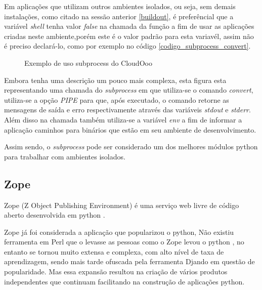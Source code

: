 Em aplicações que utilizam outros ambientes isolados, ou seja, sem demais instalações, como citado na sessão anterior \ref{buildout}, é preferêncial que a variável \textit{shell} tenha valor \textit{false} na chamada da função a fim de usar as aplicações criadas neste ambiente,porém este é o valor padrão para esta variavél, assim não é preciso declará-lo, como por exemplo no código \ref{codigo_subprocess_convert}.

\begin{figure}[ht]
    \centering
    \caption{Exemplo de uso subprocess do CloudOoo}
    \label{subprocess_convert}
\end{figure}

Embora tenha uma descrição um pouco mais complexa, esta figura esta representando uma chamada do \textit{subprocess} em que utiliza-se o comando \textit{convert}, utiliza-se a opção \textit{PIPE} para que, após executado, o comando retorne as mensagens de saída e erro respectivamente através das variáveis \textit{stdout} e \textit{stderr}. Além disso na chamada também utiliza-se a variável \textit{env} a fim de informar a aplicação caminhos para binários que estão em seu ambiente de desenvolvimento.

Assim sendo, o \textit{subprocess} pode ser considerado um dos melhores módulos python para trabalhar com ambientes isolados.

\subsection{Zope}

Zope (Z Object Publishing Environment) é uma serviço web livre de código aberto desenvolvida em python \cite{ZOPE2}.

Zope já foi considerada a aplicação que popularizou o python, Não existiu ferramenta em Perl que o levasse as pessoas como o Zope levou o python \cite{UDELL}, no entanto se tornou muito extensa e complexa, com alto nível de taxa de aprendizagem, sendo mais tarde ofuscada pela ferramenta Djando em questão de popularidade. Mas essa expansão resultou na criação de vários produtos independentes que continuam facilitando na construção de aplicações python.

